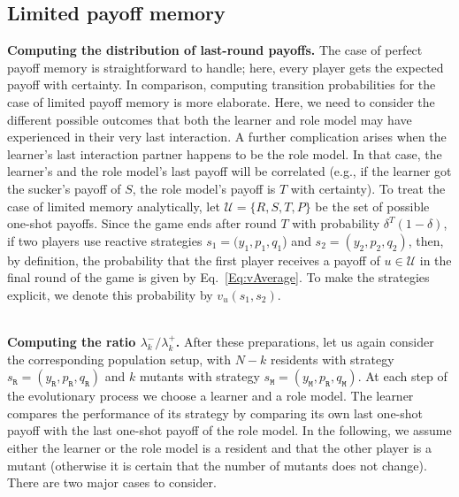 \documentclass[11pt]{article}
\def\resident{\texttt{R}}
\def\mutant{\texttt{M}}
\def\strategy{s}
\theoremstyle{plainCl1}
\theoremstyle{plainCl2}
\begin{document}

\subsection{Limited payoff memory}\label{section:limited_memory}


{\bf Computing the distribution of last-round payoffs.}
The case of perfect payoff memory is straightforward to handle; here, every player gets the expected payoff with certainty. 
In comparison, computing transition probabilities for the case of limited payoff memory is more elaborate. 
Here, we need to consider the different possible outcomes that both the learner and role model may have experienced in their very last interaction. 
A further complication arises when the learner's last interaction partner happens to be the role model. 
In that case, the learner's and the role model's last payoff will be correlated (e.g., if the learner got the sucker's payoff of $S$, the role model's payoff is $T$ with certainty). 
To treat the case of limited memory analytically, let $\mathcal{U} \!=\! \{R,S,T,P\}$ be the set of possible one-shot payoffs. 
Since the game ends after round $T$ with probability $\delta^{T}\left(1-\delta\right)$, if two players use reactive strategies $\strategy_1\!=\!(y_1, p_1, q_1$)  and $\strategy_2\!=\!(y_2,p_2,q_2)$, then, by definition, the probability that the first player receives a payoff of $u\!\in\!\mathcal{U}$ in the final round of the game is given by Eq.~\eqref{Eq:vAverage}. To make the strategies explicit, we denote this probability by $v_{u}\!\left(\strategy_{1},\strategy_{2}\right)$.


~\\
\noindent
{\bf Computing the ratio $\lambda^-_k/\lambda^+_k$.}
After these preparations, let us again consider the corresponding population setup, with $N\!-\!k$ residents with strategy  \(\strategy_\resident = (y_\resident, p_\resident, q_\resident)\) and $k$ mutants with strategy  \(\strategy_\mutant = (y_\mutant, p_\resident, q_\mutant)\).
At each step of the evolutionary process we choose a learner and a role model. 
The learner compares the performance of its strategy by comparing its own last one-shot payoff with the last one-shot payoff of the role model. 
In the following, we assume either the learner or the role model is a resident and that the other player is a mutant (otherwise it is certain that the number of mutants does not change). 
There are two major cases to consider. 
\end{document}
